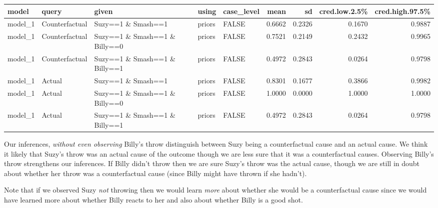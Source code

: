 \documentclass[
  12pt,
]{book}
\begin{document}
\begin{tabular}{l|l|l|l|l|r|r|r|r}
\hline
model & query & given & using & case\_level & mean & sd & cred.low.2.5\% & cred.high.97.5\%\\
\hline
model\_1 & Counterfactual & Suzy==1 \& Smash==1 & priors & FALSE & 0.6662 & 0.2326 & 0.1670 & 0.9887\\
\hline
model\_1 & Counterfactual & Suzy==1 \& Smash==1 \& Billy==0 & priors & FALSE & 0.7521 & 0.2149 & 0.2432 & 0.9965\\
\hline
model\_1 & Counterfactual & Suzy==1 \& Smash==1 \& Billy==1 & priors & FALSE & 0.4972 & 0.2843 & 0.0264 & 0.9798\\
\hline
model\_1 & Actual & Suzy==1 \& Smash==1 & priors & FALSE & 0.8301 & 0.1677 & 0.3866 & 0.9982\\
\hline
model\_1 & Actual & Suzy==1 \& Smash==1 \& Billy==0 & priors & FALSE & 1.0000 & 0.0000 & 1.0000 & 1.0000\\
\hline
model\_1 & Actual & Suzy==1 \& Smash==1 \& Billy==1 & priors & FALSE & 0.4972 & 0.2843 & 0.0264 & 0.9798\\
\hline
\end{tabular}

Our inferences, \emph{without even observing} Billy's throw distinguish between Suzy being a counterfactual cause and an actual cause. We think it likely that Suzy's throw was an actual cause of the outcome though we are less sure that it was a counterfactual causes. Observing Billy's throw strengthens our inferences. If Billy didn't throw then we are sure Suzy's throw was the actual cause, though we are still in doubt about whether her throw was a counterfactual cause (since Billy might have thrown if she hadn't).

Note that if we observed Suzy \emph{not} throwing then we would learn \emph{more} about whether she would be a counterfactual cause since we would have learned more about whether Billy reacts to her and also about whether Billy is a good shot.
\end{document}
